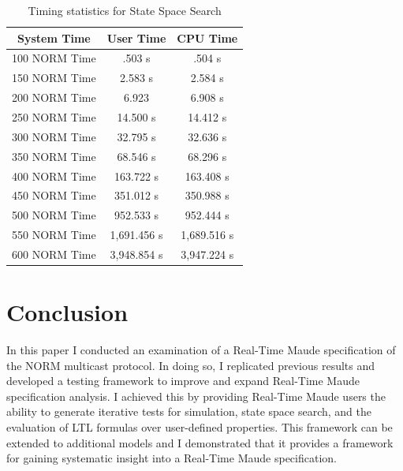 \documentclass[10pt, journal]{IEEEtran}
\begin{document}
\begin{table}[h!]
\centering
 \begin{tabular}{||c c c||} 
 \hline
 System Time & User Time & CPU Time \\ [0.5ex] 
 \hline\hline
 100 NORM Time & .503 s & .504 s \\ 
 \hline
 150 NORM Time & 2.583 s & 2.584 s \\
 \hline
 200 NORM Time& 6.923 & 6.908 s \\
 \hline
 250 NORM Time & 14.500 s & 14.412 s \\
 \hline
 300 NORM Time & 32.795 s & 32.636 s \\ 
 \hline
 350 NORM Time & 68.546 s & 68.296 s \\
 \hline
 400 NORM Time & 163.722 s & 163.408 s \\
 \hline
 450 NORM Time & 351.012 s & 350.988 s \\
 \hline
 500 NORM Time & 952.533 s & 952.444 s \\
 \hline
 550 NORM Time & 1,691.456 s & 1,689.516 s \\ 
 \hline
 600 NORM Time & 3,948.854 s & 3,947.224 s \\[.5ex]
 \hline
\end{tabular}
\caption{Timing statistics for State Space Search}
\label{table:1}
\end{table}

\section{Conclusion}
In this paper I conducted an examination of a Real-Time Maude specification of the NORM multicast protocol. In doing so, I replicated previous results and developed a testing framework to improve and expand Real-Time Maude specification analysis. I achieved this by providing Real-Time Maude users the ability to generate iterative tests for simulation, state space search, and the evaluation of LTL formulas over user-defined properties. This framework can be extended to additional models and I demonstrated that it provides a framework for gaining systematic insight into a Real-Time Maude specification.



\end{document}
